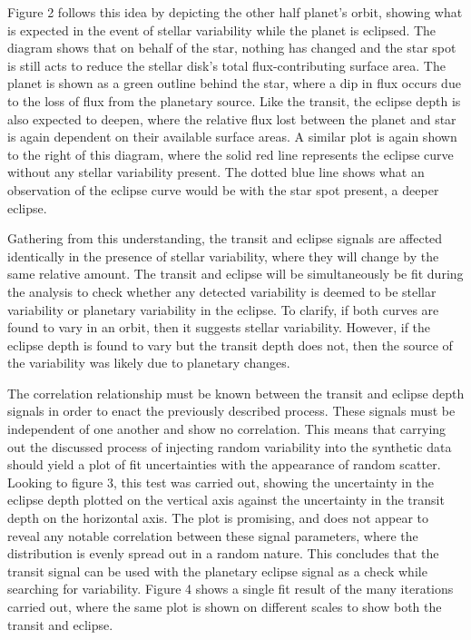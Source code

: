 \documentclass[manuscript]{aastex}
\begin{document}
    Figure 2 follows this idea by depicting the other half planet's orbit, showing what is expected in the event of stellar variability while the planet is eclipsed. The diagram shows that on behalf of the star, nothing has changed and the star spot is still acts to reduce the stellar disk's total flux-contributing surface area. The planet is shown as a green outline behind the star, where a dip in flux occurs due to the loss of flux from the planetary source. Like the transit, the eclipse depth is also expected to deepen, where the relative flux lost between the planet and star is again dependent on their available surface areas. A similar plot is again shown to the right of this diagram, where the solid red line represents the eclipse curve without any stellar variability present. The dotted blue line shows what an observation of the eclipse curve would be with the star spot present, a deeper eclipse. 
    
    Gathering from this understanding, the transit and eclipse signals are affected identically in the presence of stellar variability, where they will change by the same relative amount. The transit and eclipse will be simultaneously be fit during the analysis to check whether any detected variability is deemed to be stellar variability or planetary variability in the eclipse. To clarify, if both curves are found to  vary in an orbit, then it suggests stellar variability. However, if the eclipse depth is found to vary but the transit depth does not, then the source of the variability was likely due to planetary changes.
 
	The correlation relationship must be known between the transit and eclipse depth signals in order to enact the previously described process. These signals must be independent of one another and show no correlation. This means that carrying out the discussed process of injecting random variability into the synthetic data should yield a plot of fit uncertainties with the appearance of random scatter. Looking to figure 3, this test was carried out, showing the uncertainty in the eclipse depth plotted on the vertical axis against the uncertainty in the transit depth on the horizontal axis. The plot is promising, and does not appear to reveal any notable correlation between these signal parameters, where the distribution is evenly spread out in a random nature. This concludes that the transit signal can be used with the planetary eclipse signal as a check while searching for variability. Figure 4 shows a single fit result of the many iterations carried out, where the same plot is shown on different scales to show both the transit and eclipse.
\end{document}
